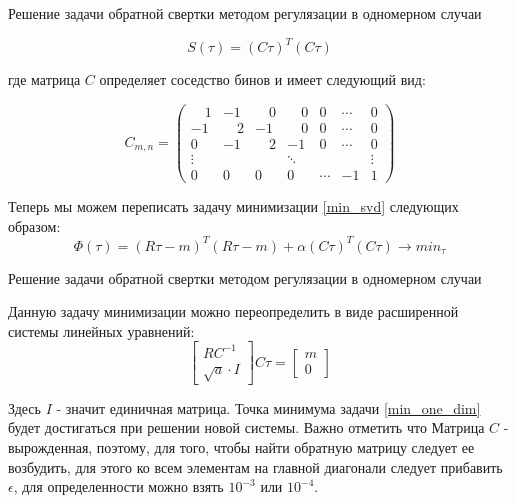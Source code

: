 \documentclass[fullscreen=true,russian,compress,%
	hyperref={unicode,bookmarks=false}]{presentation}
\begin{document}
\begin{frame}{Решение задачи обратной свертки методом регулязации в одномерном случаи}

   \begin{equation}
      S(\tau) = (C\tau)^T(C\tau)
  \end{equation}
 
  где матрица $C$ определяет соседство бинов и имеет следующий вид:

   \begin{equation}
       C_{m,n} = 
    \begin{pmatrix}
      \quad 1 &       -1 &  \quad 0 &  \quad 0 & 0 & \cdots & 0 \\
           -1 &  \quad 2 &       -1 &  \quad 0 & 0 & \cdots & 0 \\
            0 &       -1 & \quad  2 &       -1 & 0 & \cdots & 0 \\
     \vdots &  & & \ddots & & & \vdots \\
     0  & 0  & 0 & 0 & \cdots & -1 & 1
    \end{pmatrix}
    \label{one_dim_neighbors_mat}
   \end{equation}

   Теперь мы можем переписать задачу минимизации \eqref{min_svd} следующих образом:
   \begin{equation}
      \Phi(\tau)=(R\tau-m)^T (R\tau-m) + \alpha(C\tau)^T(C\tau) \to min_{\tau}
      \label{min_one_dim}
   \end{equation}
\end{frame}


\begin{frame}{Решение задачи обратной свертки методом регулязации в одномерном случаи}

Данную задачу минимизации можно переопределить в виде расширенной системы линейных уравнений:
\begin{equation}
    \begin{bmatrix}
        RC^{-1} \\
        \sqrt{a} \cdot I
    \end{bmatrix}
    C\tau = 
    \begin{bmatrix}
        m \\
        0
    \end{bmatrix}
    \label{system_one_dim}
\end{equation}

Здесь $I$ - значит единичная матрица. 
Точка минимума задачи \eqref{min_one_dim} будет достигаться при решении новой системы. Важно отметить что Матрица
$C$ - вырожденная, поэтому, для того, чтобы найти обратную матрицу следует ее возбудить, для этого ко всем элементам
на главной диагонали следует прибавить $\epsilon$, для определенности можно взять $10^{-3}$ или $10^{-4}$.

\end{frame}
\end{document}

